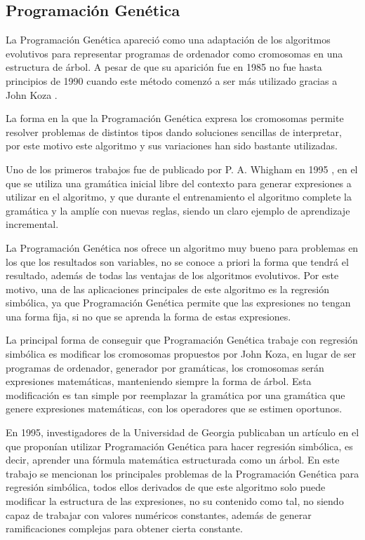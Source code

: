 
\subsection{Programación Genética}

La Programación Genética apareció como una adaptación de los algoritmos evolutivos para representar programas de ordenador como cromosomas en una estructura de árbol. A pesar de que su aparición fue en 1985 no fue hasta principios de 1990 cuando este método comenzó a ser más utilizado gracias a John Koza \cite{kozaGP}.

La forma en la que la Programación Genética expresa los cromosomas permite resolver problemas de distintos tipos dando soluciones sencillas de interpretar, por este motivo este algoritmo y sus variaciones han sido bastante utilizadas.

Uno de los primeros trabajos fue de publicado por P. A. Whigham en 1995 \cite{PGgramaticas}, en el que se utiliza una gramática inicial libre del contexto para generar expresiones a utilizar en el algoritmo, y que durante el entrenamiento el algoritmo complete la gramática y la amplíe con nuevas reglas, siendo un claro ejemplo de aprendizaje incremental.

La Programación Genética nos ofrece un algoritmo muy bueno para problemas en los que los resultados son variables, no se conoce a priori la forma que tendrá el resultado, además de todas las ventajas de los algoritmos evolutivos. Por este motivo, una de las aplicaciones principales de este algoritmo es la regresión simbólica, ya que Programación Genética permite que las expresiones no tengan una forma fija, si no que se aprenda la forma de estas expresiones.

La principal forma de conseguir que Programación Genética trabaje con regresión simbólica es modificar los cromosomas propuestos por John Koza, en lugar de ser programas de ordenador, generador por gramáticas, los cromosomas serán expresiones matemáticas, manteniendo siempre la forma de árbol. Esta modificación es tan simple por reemplazar la gramática por una gramática que genere expresiones matemáticas, con los operadores que se estimen oportunos.



En 1995, investigadores de la Universidad de Georgia publicaban un artículo \cite{primerGAP} en el que proponían utilizar Programación Genética para hacer regresión simbólica, es decir, aprender una fórmula matemática estructurada como un árbol. En este trabajo se mencionan los principales problemas de la Programación Genética para regresión simbólica, todos ellos derivados de que este algoritmo solo puede modificar la estructura de las expresiones, no su contenido como tal, no siendo capaz de trabajar con valores numéricos constantes, además de generar ramificaciones complejas para obtener cierta constante.

